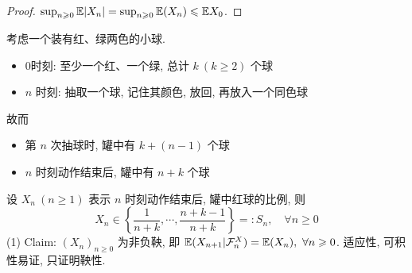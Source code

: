 \begin{proof}
    $\sup_{n\geqslant 0}\mathbb E |X_n|=\sup_{n\geqslant 0}\mathbb E (X_n)\leqslant \mathbb E X_0$.
\end{proof}

\begin{example}[罐子]
    考虑一个装有红、绿两色的小球.
    \begin{itemize}
        \item 0时刻: 至少一个红、一个绿, 总计 $k\ (k\geq 2)$ 个球 
        \item $n$ 时刻: 抽取一个球, 记住其颜色, 放回, 再放入一个同色球
    \end{itemize}
    故而 \begin{itemize}
        \item 第 $n$ 次抽球时, 罐中有 $k+(n-1)$ 个球
        \item $n$ 时刻动作结束后, 罐中有 $n+k$ 个球
    \end{itemize}
\end{example}

设 $X_n\ (n\geq 1)$ 表示 $n$ 时刻动作结束后, 罐中红球的比例, 则
\[
X_n\in \left\{
    \frac{1}{n+k},\cdots, \frac{n+k-1}{n+k}
\right\}=:S_n,\quad \forall n\geq 0
\]
(1) Claim: $(X_n)_{n\geq 0}$ 为非负鞅, 即 $\EE(X_{n+1}|\CF_n^X)=\EE(X_n),\ \forall n\geq 0$. 适应性, 可积性易证, 只证明鞅性.

